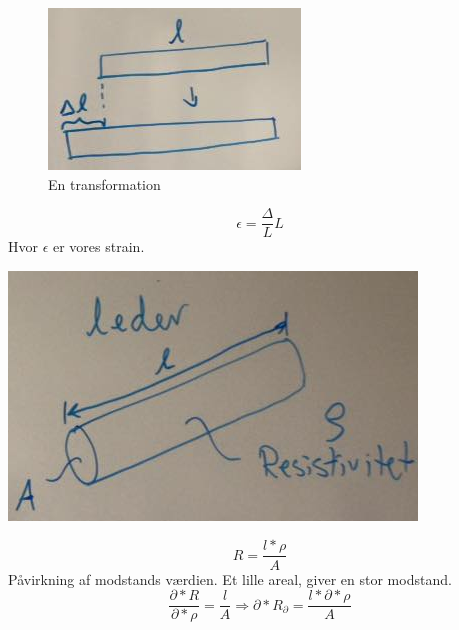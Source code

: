 \documentclass[12pt, letterpaper]{article}
\begin{document}
\begin{figure}[h!]
\includegraphics[width=\textwidth]{billeder/billede32}
\caption{En transformation}
\end{figure}

$$\epsilon = \frac{\Delta}L{L}$$
Hvor $\epsilon$ er vores strain.

\begin{center}
\includegraphics[width=\textwidth]{billeder/billede33}
\end{center}
$$R=\frac{l*\rho}{A}$$
Påvirkning af modstands værdien. Et lille areal, giver en stor modstand.
$$\frac{\partial*R}{\partial*\rho}=\frac{l}{A}\Rightarrow\partial*R_\partial=\frac{l*\partial*\rho}{A}$$
\end{document}
